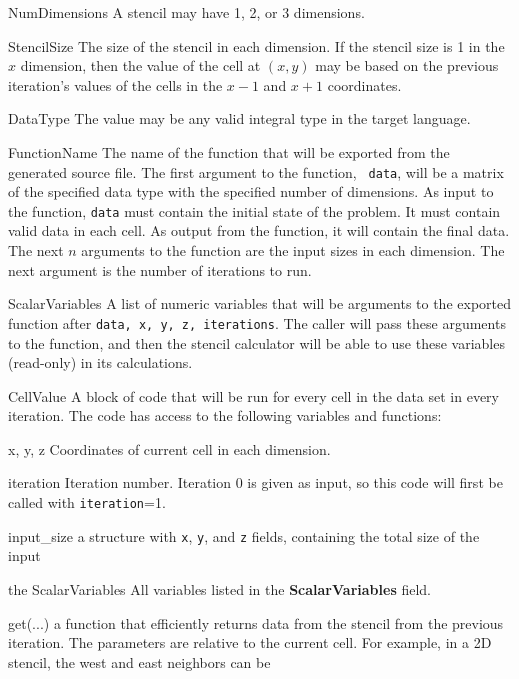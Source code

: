 \documentclass{sig-alternate}
\begin{document}
\begin{description*}
\item[NumDimensions] A stencil may have 1, 2, or 3 dimensions.
\item[StencilSize] The size of the stencil in each dimension.  If the
  stencil size is 1 in the $x$ dimension, then the value of the cell at $(x,
  y)$ may be based on the previous iteration's values of the cells in the
  $x-1$ and $x+1$ coordinates.
\item[DataType] The value may be any valid integral type in the target
  language.
\item[FunctionName] The name of the function that will be exported
  from the generated source file.  The first argument to the function, {\tt
    data}, will be a matrix of the specified data type with the specified
  number of dimensions.  As input to the function, {\tt data} must contain
  the initial state of the problem.  It must contain valid data in each cell.
  As output from the function, it will contain the final data.  The next $n$
  arguments to the function are the input sizes in each dimension.  The next
  argument is the number of iterations to run.
\item[ScalarVariables] A list of numeric variables that will be
  arguments to the exported function after {\tt data, x, y, z, itera\-tions}.
  The caller will pass these arguments to the function, and then the stencil
  calculator will be able to use these variables (read-only) in its
  calculations.
\item[CellValue] A block of code that will be run for every cell in the data
  set in every iteration.  The code has access to the following variables and
  functions:
\begin{description*}
\item[x, y, z] Coordinates of current cell in each dimension.
\item[iteration] Iteration number.  Iteration 0 is given as input, so
  this code will first be called with {\tt iteration}=1.
\item[input\_size] a structure with {\tt x}, {\tt y}, and {\tt z}
  fields, containing the total size of the input
\item[the ScalarVariables] All variables listed in the {\bf ScalarVariables}
  field.
\item[get(...)] a function that efficiently returns data from the stencil
  from the previous iteration.  The parameters are relative to the current
  cell.  For example, in a 2D stencil, the west and east neighbors can be

\end{description*}
\end{description*}
\end{document}

